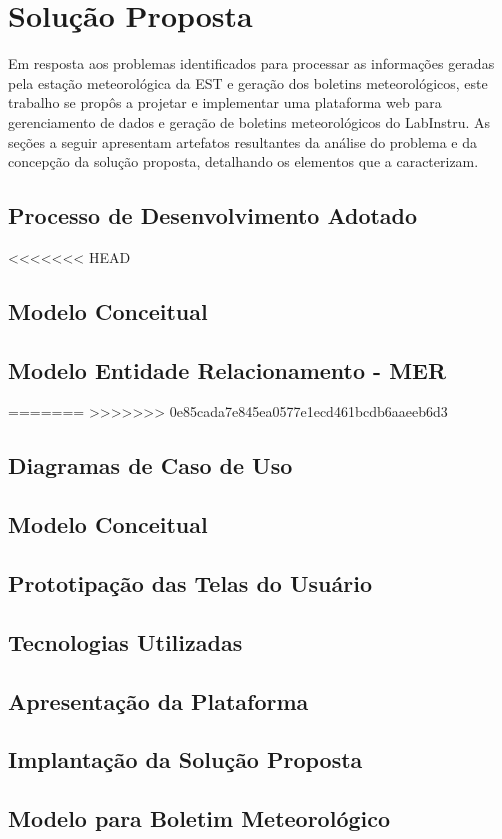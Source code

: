 \chapter{Solução Proposta} \label{cap:solucao}

Em resposta aos problemas identificados para processar as informações geradas pela estação meteorológica da EST e geração dos boletins meteorológicos, este trabalho se propôs a projetar e implementar uma plataforma web para gerenciamento de dados e geração de boletins meteorológicos do LabInstru. As seções a seguir apresentam artefatos resultantes da análise do problema e da concepção da solução proposta, detalhando os elementos que a caracterizam.


\section{Processo de Desenvolvimento Adotado}


<<<<<<< HEAD
\section{Modelo Conceitual}


\section{Modelo Entidade Relacionamento - MER}


=======
>>>>>>> 0e85cada7e845ea0577e1ecd461bcdb6aaeeb6d3
\section{Diagramas de Caso de Uso}


\section{Modelo Conceitual}


\section{Prototipação das Telas do Usuário}


\section{Tecnologias Utilizadas}


\section{Apresentação da Plataforma}


\section{Implantação da Solução Proposta}

\section{Modelo para Boletim Meteorológico}

